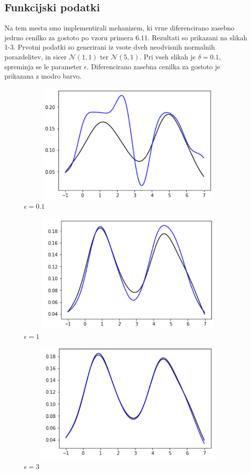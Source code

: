 \documentclass[12pt,a4paper]{amsart}
\theoremstyle{definition} %
\theoremstyle{plain} %
\begin{document}
\subsection{Funkcijski podatki}

Na tem mestu smo implementirali mehanizem, ki vrne diferencirano zasebno jedrno cenilko za gostoto po vzoru primera 6.11. Rezultati so prikazani na slikah 1-3. Prvotni podatki so generirani iz vsote dveh neodvisnih normalnih porazdelitev, in sicer $\mathcal{N}(1,1)$ ter $\mathcal{N}(5,1)$. Pri vseh slikah je $\delta = 0.1$, spreminja se le parameter $\epsilon$. Diferencirano zasebna cenilka za gostoto je prikazana z modro barvo.

\begin{figure}[!htb]
\centering
\caption{$\epsilon = 0.1$}
\includegraphics[width = 12cm, height = 6cm]{prva}
\end{figure}

\begin{figure}[!htb]
\centering
\caption{$\epsilon = 1$}
\includegraphics[width = 12cm, height = 6cm]{druga}
\end{figure}

\begin{figure}[!htb]
\centering
\caption{$\epsilon = 3$}
\includegraphics[width = 12cm, height = 6cm]{tretja}
\end{figure}
\end{document}
